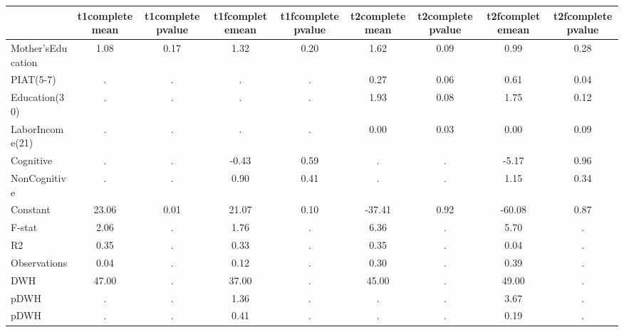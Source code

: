 \begin{table}[htbp]
\begin{tabular}{lcccccccc} \hline \hline
 & t1completemean  & t1completepvalue  & t1fcompletemean  & t1fcompletepvalue  & t2completemean  & t2completepvalue  & t2fcompletemean  & t2fcompletepvalue  \\  \hline 
Mother'sEducation &         1.08 &         0.17 &         1.32 &         0.20 &         1.62 &         0.09 &         0.99 &         0.28 \\  
PIAT(5-7) &            . &            . &            . &            . &         0.27 &         0.06 &         0.61 &         0.04 \\  
Education(30) &            . &            . &            . &            . &         1.93 &         0.08 &         1.75 &         0.12 \\  
LaborIncome(21) &            . &            . &            . &            . &         0.00 &         0.03 &         0.00 &         0.09 \\  
Cognitive &            . &            . &        -0.43 &         0.59 &            . &            . &        -5.17 &         0.96 \\  
NonCognitive &            . &            . &         0.90 &         0.41 &            . &            . &         1.15 &         0.34 \\  
Constant &        23.06 &         0.01 &        21.07 &         0.10 &       -37.41 &         0.92 &       -60.08 &         0.87 \\  
F-stat &         2.06 &            . &         1.76 &            . &         6.36 &            . &         5.70 &            . \\  
R2 &         0.35 &            . &         0.33 &            . &         0.35 &            . &         0.04 &            . \\  
Observations &         0.04 &            . &         0.12 &            . &         0.30 &            . &         0.39 &            . \\  
DWH &        47.00 &            . &        37.00 &            . &        45.00 &            . &        49.00 &            . \\  
pDWH &            . &            . &         1.36 &            . &            . &            . &         3.67 &            . \\  
pDWH &            . &            . &         0.41 &            . &            . &            . &         0.19 &            . \\  
\hline \hline \end{tabular}
\end{table}
